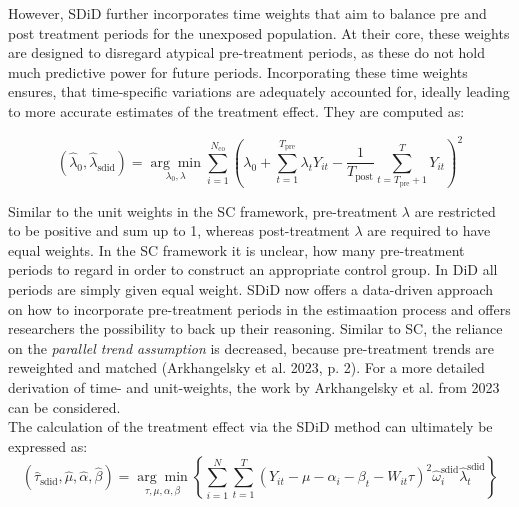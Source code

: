 \documentclass[8pt]{article}
\begin{document}
However, SDiD further incorporates time weights that aim to balance pre and post treatment periods for the unexposed population. At their core, these weights are designed to disregard atypical pre-treatment periods, as these do not hold much predictive power for future periods. Incorporating these time weights ensures, that time-specific variations are adequately accounted for, ideally leading to more accurate estimates of the treatment effect. They are computed as:

\begin{equation}
(\hat{\lambda}_0, \hat{\lambda}_{\text{sdid}}) = \underset{\lambda_0, \lambda}{\arg\min}
\sum_{i=1}^{N_{\text{co}}} \left( \lambda_0 + \sum_{t=1}^{T_{\text{pre}}} \lambda_t Y_{it} - \frac{1}{T_{\text{post}}} \sum_{t=T_{\text{pre}}+1}^{T} Y_{it} \right)^2
\end{equation}

Similar to the unit weights in the SC framework, pre-treatment $\lambda$ are restricted to be positive and sum up to 1, whereas post-treatment $\lambda$ are required to have equal weights. In the SC framework it is unclear, how many pre-treatment periods to regard in order to construct an appropriate control group. In DiD all periods are simply given equal weight. SDiD now offers a data-driven approach on how to incorporate pre-treatment periods in the estimaation process and offers researchers the possibility to back up their reasoning. Similar to SC, the reliance on the \textit{parallel trend assumption} is decreased, because pre-treatment trends are reweighted and matched (Arkhangelsky et al. 2023, p. 2). For a more detailed derivation of time- and unit-weights, the work by Arkhangelsky et al. from 2023 can be considered. \\
The calculation of the treatment effect via the SDiD method can ultimately be expressed as:
\begin{equation}
(\hat{\tau}_{\text{sdid}}, \hat{\mu}, \hat{\alpha}, \hat{\beta}) = \underset{\tau, \mu, \alpha, \beta}{\arg\min} \left\{ \sum_{i=1}^{N} \sum_{t=1}^{T} \left( Y_{it} - \mu - \alpha_i - \beta_t - W_{it} \tau \right)^2 \hat{\omega}_i^{\text{sdid}} \hat{\lambda}_t^{\text{sdid}} \right\}
\end{equation}
\end{document}
